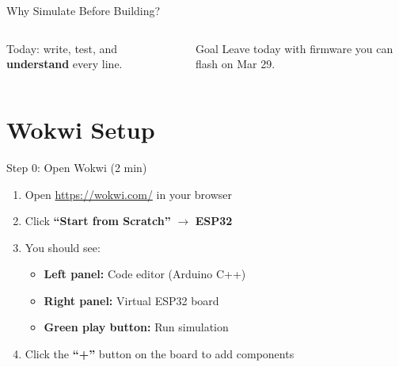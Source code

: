 \documentclass[aspectratio=169,11pt]{beamer}
\begin{document}
\begin{frame}[shrink=5]{Why Simulate Before Building?}
\begin{columns}
{\begin{minipage}{0.9\textwidth}
            \vspace{0.1cm}
            Today: write, test, and \textbf{understand} every line.
            \vspace{0.1cm}
        \end{minipage}
        }

        \vspace{0.2cm}
        \begin{alertblock}{Goal}
            \small
            Leave today with firmware you can flash on Mar 29.
        \end{alertblock}
    \end{columns}
\end{frame}

\section{Wokwi Setup}

\begin{frame}{Step 0: Open Wokwi (2 min)}
    \begin{enumerate}
        \item Open \url{https://wokwi.com/} in your browser
        \item Click \textbf{``Start from Scratch''} $\rightarrow$ \textbf{ESP32}
        \item You should see:
        \begin{itemize}
            \item \textbf{Left panel:} Code editor (Arduino C++)
            \item \textbf{Right panel:} Virtual ESP32 board
            \item \textbf{Green play button:} Run simulation
        \end{itemize}
        \item Click the \textbf{``+''} button on the board to add components
    \end{enumerate}

    \vspace{0.3cm}
\end{frame}
\end{document}
